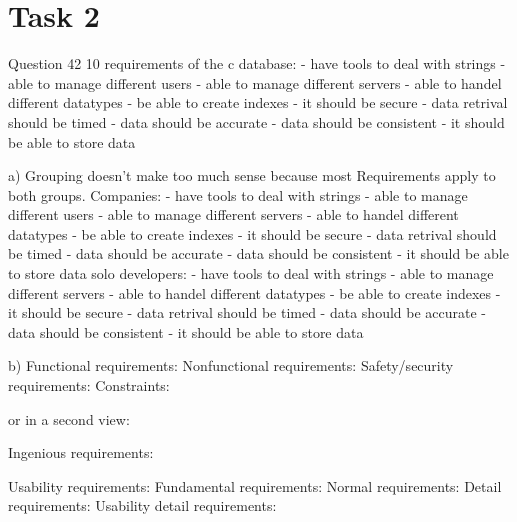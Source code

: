 \chapter{Task 2}
Question 42
10 requirements of the c database:
- have tools to deal with strings
- able to manage different users
- able to manage different servers
- able to handel different datatypes
- be able to create indexes
- it should be secure
- data retrival should be timed
- data should be accurate
- data should be consistent
- it should be able to store data

a)
Grouping doesn't make too much sense because most Requirements apply to both groups.
Companies:
- have tools to deal with strings
- able to manage different users
- able to manage different servers
- able to handel different datatypes
- be able to create indexes
- it should be secure
- data retrival should be timed
- data should be accurate
- data should be consistent
- it should be able to store data
solo developers:
- have tools to deal with strings
- able to manage different servers
- able to handel different datatypes
- be able to create indexes
- it should be secure
- data retrival should be timed
- data should be accurate
- data should be consistent
- it should be able to store data

b)
Functional requirements:
Nonfunctional requirements:
Safety/security requirements:
Constraints:

or in a second view:

Ingenious requirements:

Usability requirements:
Fundamental requirements:
 Normal requirements:
 Detail requirements:
 Usability detail requirements:
